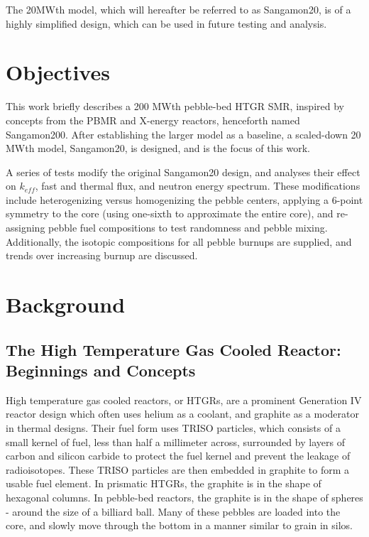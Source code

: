 The 20MWth model, which will hereafter be referred to as Sangamon20, is of a highly simplified design, which can be used in future testing and analysis.



\section{Objectives}

This work briefly describes a 200 MWth pebble-bed HTGR SMR, inspired by concepts from the PBMR and X-energy reactors, henceforth named Sangamon200.  After establishing the larger model as a baseline, a scaled-down 20 MWth model, Sangamon20, is designed, and is the focus of this work.

A series of tests modify the original Sangamon20 design, and analyses their effect on $k_{eff}$, fast and thermal flux, and neutron energy spectrum.  These modifications include heterogenizing versus homogenizing the pebble centers, applying a 6-point symmetry to the core (using one-sixth to approximate the entire core), and re-assigning pebble fuel compositions to test randomness and pebble mixing.  Additionally, the isotopic compositions for all pebble burnups are supplied, and trends over increasing burnup are discussed.

\section{Background}
\subsection{The High Temperature Gas Cooled Reactor: Beginnings and Concepts}

High temperature gas cooled reactors, or HTGRs, are a prominent Generation IV reactor design which often uses helium as a coolant, and graphite as a moderator in thermal designs.  Their fuel form uses TRISO particles, which consists of a small kernel of fuel, less than half a millimeter across, surrounded by layers of carbon and silicon carbide to protect the fuel kernel and prevent the leakage of radioisotopes.  These TRISO particles are then embedded in graphite to form a usable fuel element.  In prismatic HTGRs, the graphite is in the shape of hexagonal columns.  In pebble-bed reactors, the graphite is in the shape of spheres - around the size of a billiard ball.  Many of these pebbles are loaded into the core, and slowly move through the bottom in a manner similar to grain in silos.


